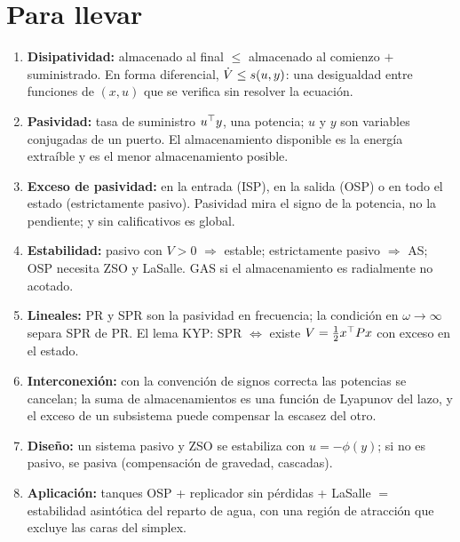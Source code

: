 \section{Para llevar}
\label{sec:pa-cierre}

\begin{parallevar}
\begin{enumerate}
  \item \textbf{Disipatividad:} almacenado al final $\le$ almacenado al comienzo $+$ suministrado. En forma diferencial, $\dot V\le s(u,y)$: una desigualdad entre funciones de $(x,u)$ que se verifica sin resolver la ecuación.
  \item \textbf{Pasividad:} tasa de suministro $u^{\top} y$, una potencia; $u$ y $y$ son variables conjugadas de un puerto. El almacenamiento disponible es la energía extraíble y es el menor almacenamiento posible.
  \item \textbf{Exceso de pasividad:} en la entrada (ISP), en la salida (OSP) o en todo el estado (estrictamente pasivo). Pasividad mira el signo de la potencia, no la pendiente; y sin calificativos es global.
  \item \textbf{Estabilidad:} pasivo con $V>0$ $\Rightarrow$ estable; estrictamente pasivo $\Rightarrow$ AS; OSP necesita ZSO y LaSalle. GAS si el almacenamiento es radialmente no acotado.
  \item \textbf{Lineales:} PR y SPR son la pasividad en frecuencia; la condición en $\omega\to\infty$ separa SPR de PR. El lema KYP: SPR $\Leftrightarrow$ existe $V=\tfrac12x^{\top} Px$ con exceso en el estado.
  \item \textbf{Interconexión:} con la convención de signos correcta las potencias se cancelan; la suma de almacenamientos es una función de Lyapunov del lazo, y el exceso de un subsistema puede compensar la escasez del otro.
  \item \textbf{Diseño:} un sistema pasivo y ZSO se estabiliza con $u=-\phi(y)$; si no es pasivo, se pasiva (compensación de gravedad, cascadas).
  \item \textbf{Aplicación:} tanques OSP + replicador sin pérdidas + LaSalle $=$ estabilidad asintótica del reparto de agua, con una región de atracción que excluye las caras del simplex.
\end{enumerate}
\end{parallevar}

